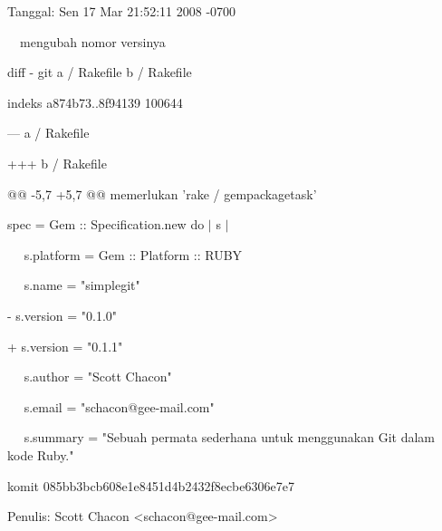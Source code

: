 \noindent 
 \hspace*{0.5in} Tanggal: Sen 17 Mar 21:52:11 2008 -0700 \par
\noindent 
 \hspace*{0.5in}  $  $ $  $ $  $ $  $mengubah nomor versinya \par
\noindent 
 \hspace*{0.5in} diff - git a / Rakefile b / Rakefile \par
\noindent 
 \hspace*{0.5in} indeks a874b73..8f94139 100644 \par
\noindent 
 \hspace*{0.5in} --- a / Rakefile \par
\noindent 
 \hspace*{0.5in} +++ b / Rakefile \par
\noindent 
 \hspace*{0.5in} @@ -5,7 +5,7 @@ memerlukan 'rake / gempackagetask' \par
\noindent 
 \hspace*{0.5in}  $  $spec = Gem :: Specification.new do  $  \vert  $ s  $  \vert  $ \par
\noindent 
 \hspace*{0.5in}  $  $ $  $ $  $ $  $ $  $s.platform = Gem :: Platform :: RUBY \par
\noindent 
 \hspace*{0.5in}  $  $ $  $ $  $ $  $ $  $s.name = "simplegit" \par
\noindent 
 \hspace*{0.5in} - s.version = "0.1.0" \par
\noindent 
 \hspace*{0.5in} + s.version = "0.1.1" \par
\noindent 
 \hspace*{0.5in}  $  $ $  $ $  $ $  $ $  $s.author = "Scott Chacon" \par
\noindent 
 \hspace*{0.5in}  $  $ $  $ $  $ $  $ $  $s.email = "schacon@gee-mail.com" \par
\noindent 
 \hspace*{0.5in}  $  $ $  $ $  $ $  $ $  $s.summary = "Sebuah permata sederhana untuk menggunakan Git dalam kode Ruby." \par
\noindent 
 \hspace*{0.5in} komit 085bb3bcb608e1e8451d4b2432f8ecbe6306e7e7 \par
\noindent 
 \hspace*{0.5in} Penulis: Scott Chacon <schacon@gee-mail.com> \par
